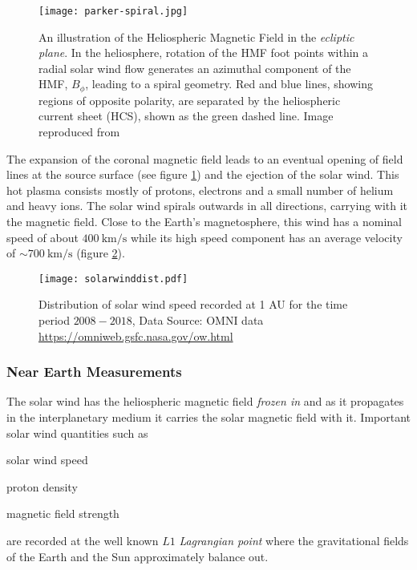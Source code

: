\begin{figure}
    \noindent\texttt{[image: parker-spiral.jpg]}
    \caption{{\small An illustration of the Heliospheric Magnetic Field in the \emph{ecliptic plane}. 
    In the heliosphere, rotation of the HMF foot points within a radial solar wind flow generates an azimuthal 
    component of the HMF, $B_{\phi}$, leading to a spiral geometry. Red and blue lines, 
    showing regions of opposite polarity, are separated by the heliospheric current sheet (HCS), 
    shown as the green dashed line.
    Image reproduced from \citet{Owens2013}}}
    \label{fig:parkerspiral}
\end{figure}


The expansion of the coronal magnetic field leads to an eventual opening of field lines at the source surface 
(see figure \ref{fig:parkerspiral}) and the ejection of the solar wind. This hot plasma consists mostly of protons, 
electrons and a small number of helium and heavy ions. The solar wind spirals outwards in all directions, carrying 
with it the magnetic field. Close to the Earth's magnetosphere, this wind has a nominal speed of about 
$\SI{400}{\kilo\metre\per\second}$ while its high speed component has an average velocity of 
$\sim \SI{700}{\kilo\metre\per\second}$ (figure \ref{fig:solarwinddist}).

\begin{figure}
    \noindent\centering\texttt{[image: solarwinddist.pdf]}
    \caption{
        {\small Distribution of solar wind speed recorded at 1 AU for the time period $2008 - 2018$, 
        Data Source: OMNI data \url{https://omniweb.gsfc.nasa.gov/ow.html}}}
    \label{fig:solarwinddist}
\end{figure}

\subsubsection*{Near Earth Measurements}

The solar wind has the heliospheric magnetic field \emph{frozen in} and as it propagates in the interplanetary medium 
it carries the solar magnetic field with it. Important solar wind quantities such as 
\begin{enumerate*} \item solar wind speed \item proton density \item magnetic field strength \end{enumerate*} 
are recorded at the well known $L1$ \emph{Lagrangian point} where the gravitational fields of the Earth and the Sun 
approximately balance out.




